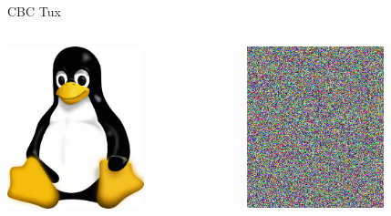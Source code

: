 \begin{frame}{CBC Tux}
  \begin{columns}
    \begin{column}{0.5\textwidth}
      \begin{center}
        \includegraphics[width=150px]{tux}
      \end{center}
    \end{column}
    \begin{column}{0.5\textwidth}
      \pause
      \begin{center}
        \includegraphics[width=150px]{tux_secure}
      \end{center}
    \end{column}
  \end{columns}
\end{frame}

